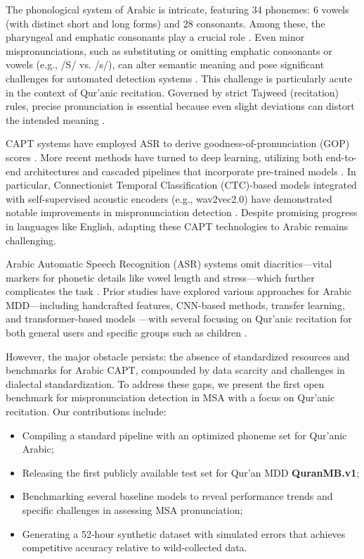 \documentclass{Interspeech}
\begin{document}
The phonological system of Arabic is intricate, featuring 34 phonemes: 6 vowels (with distinct short and long forms) and 28 consonants. Among these, the pharyngeal and emphatic consonants play a crucial role \cite{al2004phonetic}. Even minor mispronunciations, such as substituting or omitting emphatic consonants or vowels (e.g., /S/ vs. /s/), can alter semantic meaning and pose significant challenges for automated detection systems \cite{alrashoudi2025improving}.
This challenge is particularly acute in the context of Qur'anic recitation. Governed by strict Tajweed (recitation) rules, precise pronunciation is essential because even slight deviations can distort the intended meaning \cite{balula2021automatic}. 


CAPT systems have employed ASR to derive goodness-of-pronunciation (GOP) scores \cite{witt2000phone,kanters2009goodness}. More recent methods have turned to deep learning, utilizing both end-to-end architectures and cascaded pipelines that incorporate pre-trained models \cite{dhleima2024multitask}. In particular, Connectionist Temporal Classification (CTC)-based models integrated with self-supervised acoustic encoders (e.g., wav2vec2.0) have demonstrated notable improvements in mispronunciation detection \cite{wav2vec2, alrashoudi2025improving}.
Despite promising progress in languages like English, adapting these CAPT technologies to Arabic remains challenging.

Arabic Automatic Speech Recognition (ASR) systems omit diacritics—vital markers for phonetic details like vowel length and stress—which further complicates the task \cite{ali2016mgb}. Prior studies have explored various approaches for Arabic MDD—including handcrafted features, CNN-based methods, transfer learning, and transformer-based models \cite{ alrashoudi2025improving, ccalik2024novel}—with several focusing on Qur'anic recitation for both general users and specific groups such as children \cite{alsahafi2024empirical, rahman2021development, harere2023quran}.

However, the major obstacle persists: the absence of standardized resources and benchmarks for Arabic CAPT, compounded by data scarcity and challenges in dialectal standardization. To address these gaps, we present the first open benchmark for mispronunciation detection in MSA with a focus on Qur'anic recitation. Our contributions include:
\begin{itemize}
    \item Compiling a standard pipeline with an optimized phoneme set for Qur'anic Arabic; %
    \item Releasing the first publicly available test set for Qur'an MDD \textbf{QuranMB.v1};
    \item Benchmarking several baseline models to reveal performance trends and specific challenges in assessing MSA pronunciation;
    \item Generating a 52-hour synthetic dataset with simulated errors that achieves competitive accuracy relative to wild-collected data.
\end{itemize}
\end{document}
